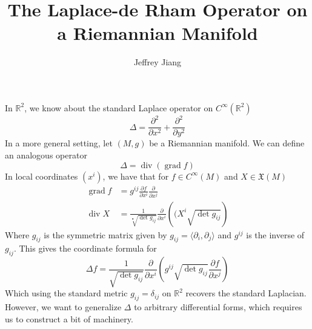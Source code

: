 \documentclass[psamsfonts]{amsart}
\theoremstyle{definition}
\theoremstyle{remark}
\newcommand{\R}{\mathbb{R}}
\DeclareMathOperator{\dv}{div}
\DeclareMathOperator{\grad}{grad}
\begin{document}
\author{Jeffrey Jiang}
\title{The Laplace-de Rham Operator on a Riemannian Manifold}
\maketitle
%
\setcounter{section}{1}
%
In $\R^2$, we know about the standard Laplace operator on $C^\infty(\R^2)$
$$\Delta = \frac{\partial^2}{\partial x^2} + \frac{\partial^2 }{\partial y^2}$$
In a more general setting, let $(M,g)$ be a Riemannian manifold. We can define an analogous operator
$$\Delta = \dv(\grad f) $$
In local coordinates $(x^i)$, we have that  for $f \in C^\infty(M)$  and $X \in \mathfrak{X}(M)$
\begin{align*}
\grad f &= g^{ij}\frac{\partial f}{\partial x^i}\frac{\partial }{\partial x^j} \\[6pt]
\dv X &= \frac{1}{\sqrt[•]{\det  g_{ij}}} \frac{\partial}{\partial x^i}\left((X^i \sqrt{\det g_{ij}}\right)
\end{align*}
Where $g_{ij}$ is the symmetric matrix given by $g_{ij} = \langle \partial_i ,\partial_j\rangle$ and $g^{ij}$ is the inverse of $g_{ij}$. This gives the coordinate formula for 
$$\Delta f = \frac{1}{\sqrt{\det g_{ij}}} \frac{\partial}{\partial x^i}\left( g^{ij} \sqrt{\det g_{ij}}\frac{\partial f}{\partial x^j} \right)$$
Which using the standard metric $g_{ij} = \delta_{ij}$ on $\R^2$ recovers the standard Laplacian. However, we want to generalize $\Delta$ to arbitrary differential forms, which requires us to construct a  bit of machinery.
\end{document}
